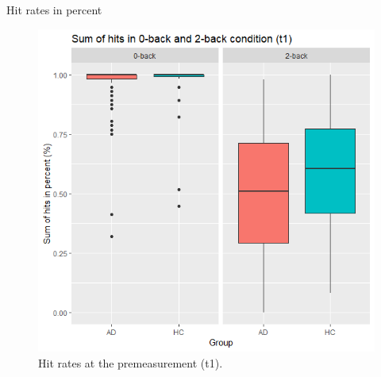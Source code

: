 \documentclass{bredelebeamer}
\begin{document}
\begin{frame}{Hit rates in percent}
\begin{figure}
\centering
     \includegraphics[scale=0.43]{images/T1_Hit.png}
    \caption{\tiny{Hit rates at the premeasurement (t1). }}
    \end{figure}
\end{frame}
\end{document}
